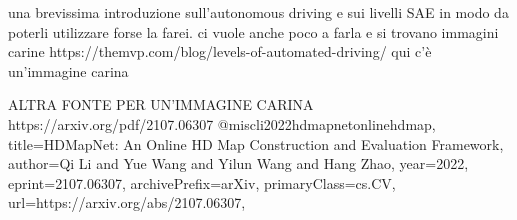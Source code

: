 una brevissima introduzione sull'autonomous driving e sui livelli SAE in modo da poterli utilizzare forse la farei. ci vuole anche poco a farla e si trovano immagini carine 
https://themvp.com/blog/levels-of-automated-driving/
qui c'è un'immagine carina 



ALTRA FONTE PER UN'IMMAGINE CARINA 
https://arxiv.org/pdf/2107.06307
@misc{li2022hdmapnetonlinehdmap,
      title={HDMapNet: An Online HD Map Construction and Evaluation Framework}, 
      author={Qi Li and Yue Wang and Yilun Wang and Hang Zhao},
      year={2022},
      eprint={2107.06307},
      archivePrefix={arXiv},
      primaryClass={cs.CV},
      url={https://arxiv.org/abs/2107.06307}, 
}